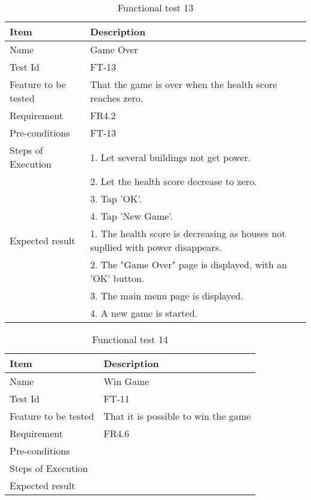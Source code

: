 \begin{table}[H]
\centering
	\begin{tabular}{ l | p{8cm} }
		\hline
		{\bf Item} & {\bf Description} \\ \hline
		Name & Game Over \\ 
		Test Id & FT-13 \\ 
		Feature to be tested & That the game is over when the health score reaches zero. \\ 
		Requirement & FR4.2 \\ 
		Pre-conditions & FT-13 \\ 
		Steps of Execution & 1. Let several buildings not get power. \\ 
		& 2. Let the health score decrease to zero. \\
		& 3. Tap 'OK'. \\
		& 4. Tap 'New Game'. \\
		Expected result & 1. The health score is decreasing as houses not supllied with power disappears. \\
		& 2. The "Game Over" page is displayed, with an 'OK' button. \\
		& 3. The main menu page is displayed. \\
		& 4. A new game is started. \\
	\end{tabular}
	\caption{Functional test 13}
\end{table}

\begin{table}[H]
\centering
	\begin{tabular}{ l | p{8cm} }
		\hline
		{\bf Item} & {\bf Description} \\ \hline
		Name & Win Game \\ 
		Test Id & FT-11 \\ 
		Feature to be tested & That it is possible to win the game \\ 
		Requirement & FR4.6 \\ 
		Pre-conditions & \\ 
		Steps of Execution &  \\ 
		Expected result & \\ 
	\end{tabular}
	\caption{Functional test 14}
\end{table}

